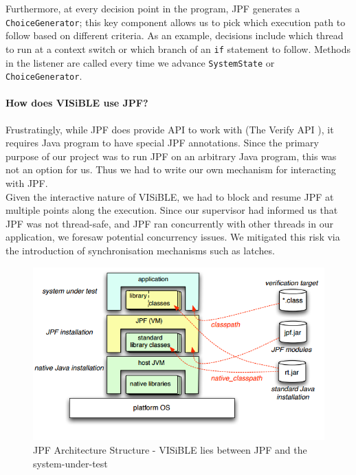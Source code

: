 \documentclass[titlepage,11pt]{article}
\begin{document}
Furthermore, at every decision point in the program, JPF generates a \texttt{ChoiceGenerator}; this key component allows us to pick which execution path to follow based on different criteria. As an example, decisions include which thread to run at a context switch or which branch of an \texttt{if} statement to follow. Methods in the listener are called every time we advance \texttt{SystemState} or \texttt{ChoiceGenerator}.

 \paragraph{How does VISiBLE use JPF?} 
Frustratingly, while JPF does provide API to work with (The Verify API \cite{verify}), it requires Java program to have special JPF annotations. Since the primary purpose of our project was to run JPF on an arbitrary Java program, this was not an option for us. Thus we had to write our own mechanism for interacting with JPF. \\

Given the interactive nature of VISiBLE, we had to block and resume JPF at multiple points along the execution. Since our supervisor had informed us that JPF was not thread-safe, and JPF ran concurrently with other threads in our application, we foresaw potential concurrency issues. We mitigated this risk via the introduction of synchronisation mechanisms such as latches. \\

\begin{figure}
\centering
\includegraphics[scale=0.4]{jvm_jpf_overview.png}
\caption{JPF Architecture Structure - VISiBLE lies between JPF and the system-under-test \cite{petermehlitz2010}}
\label{jpf_jvm}
\end{figure}
\end{document}
